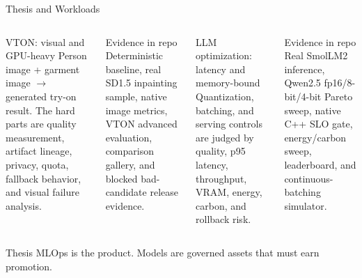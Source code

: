 \documentclass[aspectratio=169,10pt]{beamer}
\newcommand{\source}[1]{%
}
\begin{document}
\begin{frame}{Thesis and Workloads}
  \small
  \begin{columns}[T,totalwidth=\textwidth]
    \begin{block}{VTON: visual and GPU-heavy}
      Person image + garment image \(\rightarrow\) generated try-on result. The hard parts are quality measurement, artifact lineage, privacy, quota, fallback behavior, and visual failure analysis.
    \end{block}

    \begin{exampleblock}{Evidence in repo}
      Deterministic baseline, real SD1.5 inpainting sample, native image metrics, VTON advanced evaluation, comparison gallery, and blocked bad-candidate release evidence.
    \end{exampleblock}

    \begin{block}{LLM optimization: latency and memory-bound}
      Quantization, batching, and serving controls are judged by quality, p95 latency, throughput, VRAM, energy, carbon, and rollback risk.
    \end{block}

    \begin{exampleblock}{Evidence in repo}
      Real SmolLM2 inference, Qwen2.5 fp16/8-bit/4-bit Pareto sweep, native C++ SLO gate, energy/carbon sweep, leaderboard, and continuous-batching simulator.
    \end{exampleblock}
  \end{columns}

  \begin{alertblock}{Thesis}
    MLOps is the product. Models are governed assets that must earn promotion.
  \end{alertblock}
  \source{\texttt{docs/architecture.md}; \texttt{reports/benchmark\_run\_report.md}.}
\end{frame}
\end{document}
